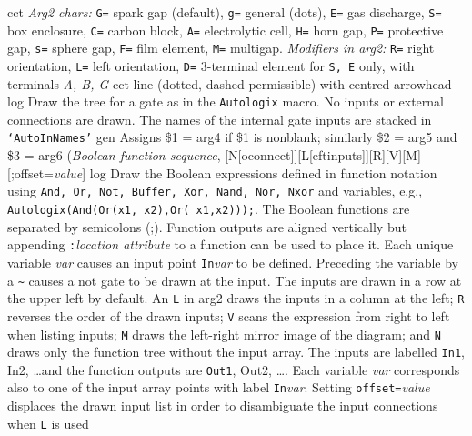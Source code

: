   {cct}
{
                                 {\sl Arg2 chars:}
                                   {\tt G=} spark gap (default),
                                   {\tt g=} general (dots),
                                   {\tt E=} gas discharge,
                                   {\tt S=} box enclosure,
                                   {\tt C=} carbon block,
                                   {\tt A=} electrolytic cell,
                                   {\tt H=} horn gap,
                                   {\tt P=} protective gap,
                                   {\tt s=} sphere gap,
                                   {\tt F=} film element,
                                   {\tt M=} multigap.
                                 {\sl Modifiers in arg2:}
                                   {\tt R=} right orientation,
                                   {\tt L=} left orientation,
                                   {\tt D=} 3-terminal element for {\tt S, E}
                                      only, with terminals {\sl A, B, G}
   }
  {cct}
  {line (dotted, dashed permissible) with centred arrowhead
    }
  {log}
  {Draw the tree for a gate as in the {\tt Autologix} macro.  No inputs
   or external connections are drawn.  The names of the internal gate
   inputs are stacked in {\tt `AutoInNames'}}
  {gen}
  {Assigns \$1 = arg4 if \$1 is nonblank; similarly \$2 = arg5 and \$3 = arg6}
%
 {({\sl Boolean function sequence},%
    [N[oconnect]][L[eftinputs]][R][V][M][;offset={\sl value}]}
  {log}
  {Draw the Boolean expressions defined in function notation
   using {\tt And, Or, Not, Buffer, Xor, Nand, Nor, Nxor}
   and variables, e.g.,
   {\tt Autologix(And(Or(x1,~x2),Or(~x1,x2)));}.
   The Boolean functions are separated by semicolons (;). Function
   outputs are aligned vertically but appending
   {\tt:}{\sl location attribute} to a function can be used to place it.
   Each unique variable {\sl var} causes an input point {\tt In}{\sl var} 
   to be defined.  Preceding the variable by a {\tt \~{}} causes a not gate
   to be drawn at the input.
   The inputs are drawn in a row at the upper left by default.
   An {\tt L} in arg2 draws the inputs in a column at the left;
   {\tt R} reverses the order of the drawn inputs;
   {\tt V} scans the expression from right to left
   when listing inputs;
   {\tt M} draws the left-right mirror image of the diagram;
   and {\tt N} draws only the function tree without the input array.
   The inputs are labelled {\tt In1}, {In2}, \ldots and the function
   outputs are {\tt Out1}, {Out2}, \dots.
   Each variable {\sl var} corresponds also to one of the input array
   points with label {\tt In}{\sl var}.
   Setting {\tt offset=}{\sl value} displaces the
   drawn input list in order to disambiguate the input connections when {\tt L}
   is used}
